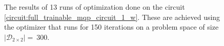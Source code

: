\begin{figure}[!ht]
    \centering
    \scalebox{0.9}{
        
    }
    \caption{The results of 13 runs of optimization done on the circuit \ref{circuit:full_trainable_mqp_circuit_1_w}. These are achieved using the  optimizer that runs for 150 iterations on a problem space of size $\left|\mathcal{D}_{2\times2}\right| =\ 300$.}
    \label{figure:amsgrad_boxplots}
\end{figure}

\clearpage







